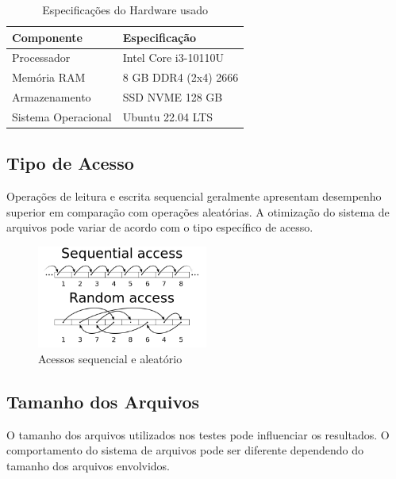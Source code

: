 \documentclass[
	12pt,				%
	openright,			%
	oneside,			%
	a4paper,			%
	chapter=TITLE,		%
	english,			%
	french,				%
	spanish,			%
	brazil				%
	]{abntex2}
\theoremstyle{definition}
\begin{document}
\begin{table}
    \centering
    \caption{Especificações do Hardware usado}
    \begin{tabular}{@{}ll@{}}
        \toprule
        \textbf{Componente} & \textbf{Especificação} \\
        \midrule
        Processador & Intel Core i3-10110U \\
        Memória RAM & 8 GB DDR4 (2x4) 2666 \\
        Armazenamento & SSD NVME 128 GB \\
        Sistema Operacional & Ubuntu 22.04 LTS \\
        \bottomrule
    \end{tabular}
    \label{tab:ideapad_specs}
\end{table}
\subsection{Tipo de Acesso}

Operações de leitura e escrita sequencial geralmente apresentam desempenho superior 
em comparação com operações aleatórias. A otimização do sistema de arquivos 
pode variar de acordo com o tipo específico de acesso.

\begin{figure}[H]
	\centering
	\includegraphics[width=0.5\textwidth]{RandomVsSeq.png}
	\caption{Acessos sequencial e aleatório}
\end{figure}

\subsection{Tamanho dos Arquivos}

O tamanho dos arquivos utilizados nos testes pode influenciar os resultados. 
O comportamento do sistema de arquivos pode ser diferente dependendo do 
tamanho dos arquivos envolvidos.

\end{document}
